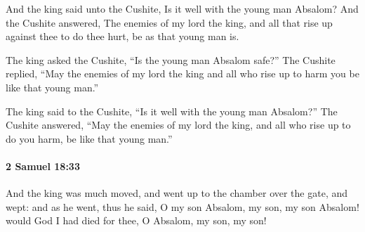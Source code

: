 			\begin{versebox}
					\item[BHS] 
					\item[ASV] And the king said unto the Cushite, Is it well with the young man Absalom? And the Cushite answered, The enemies of my lord the king, and all that rise up against thee to do thee hurt, be as that young man is.
					\item[NIV] The king asked the Cushite, “Is the young man Absalom safe?” The Cushite replied, “May the enemies of my lord the king and all who rise up to harm you be like that young man.”
					\item[NRSV] The king said to the Cushite, “Is it well with the young man Absalom?” The Cushite answered, “May the enemies of my lord the king, and all who rise up to do you harm, be like that young man.”
			\end{versebox}

		\paragraph{2 Samuel 18:33} %
			\label{2SAMUEL-18-33}

			And the king was much moved, and went up to the chamber over the gate, and wept: and as he went, thus he said, O my son Absalom, my son, my son Absalom! would God I had died for thee, O Absalom, my son, my son!

